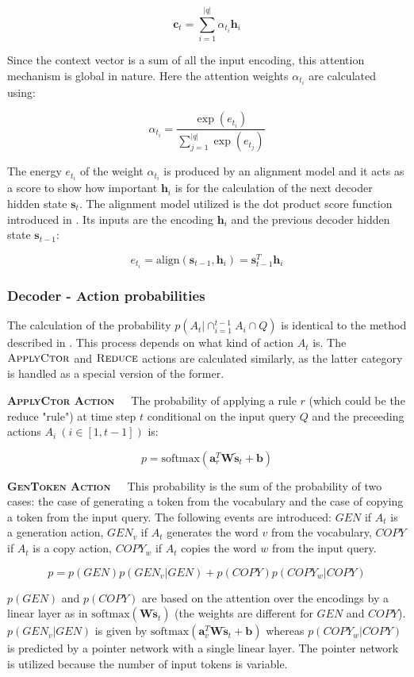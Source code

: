 \[\textbf{c}_{t} = \sum_{i=1}^{|q|}\alpha_{t_{i}}\textbf{h}_{i}\]

Since the context vector is a sum of all the input encoding, this attention
mechanism is global in nature. Here the attention weights \(\alpha_{t_{i}}\)
are calculated using:

\[\alpha_{t_{i}} = \frac{\exp(e_{t_{i}})}{\sum_{j=1}^{|q|}\exp(e_{t_{j}})}\]

The energy \(e_{t_{i}}\) of the weight \(\alpha_{t_{i}}\) is produced by an alignment
model and it acts as a score to show how important \(\textbf{h}_{i}\) is for the
calculation of the next decoder hidden state \(\textbf{s}_{t}\). The alignment
model utilized is the dot product score function introduced in \cite{LuongPhamManning2015}.
Its inputs are the encoding \(\textbf{h}_{i}\) and the previous decoder
hidden state \(\textbf{s}_{t-1}\):

\[e_{t_{i}} = \text{align}(\textbf{s}_{t-1}, \textbf{h}_{i}) = \textbf{s}_{t-1}^{T}\textbf{h}_{i}\]

\subsubsection{Decoder - Action probabilities}

The calculation of the probability \(p(A_{t} | \cap_{i=1}^{t-1} A_{i} \cap Q)\)
is identical to the method described in \cite{YinNeubig2018}. This process
depends on what kind of action \(A_{t}\) is. The \(\textsc{ApplyCtor}\) and
\(\textsc{Reduce}\) actions are calculated similarly, as the latter category
is handled as a special version of the former.

\textbf{\textsc{ApplyCtor Action}}\ \ \ The probability of applying a rule
\(r\) (which could be the reduce "rule") at time step \(t\) conditional
on the input query \(Q\) and the preceeding actions \(A_{i} \ (i \in [1,t-1])\) is:

\[p = \text{softmax}(\textbf{a}_{r}^{T}\textbf{W}\tilde{\textbf{s}}_{t} + \textbf{b})\]


\textbf{\textsc{GenToken Action}}\ \ \ This probability is the sum of the
probability of two cases: the case of generating a token from the vocabulary
and the case of copying a token from the input query. The following events are
introduced: \(GEN\) if \(A_{t}\) is a generation action, \(GEN_{v}\) if \(A_{t}\)
generates the word \(v\) from the vocabulary, \(COPY\) if \(A_{t}\) is a copy
action, \(COPY_{w}\) if \(A_{t}\) copies the word \(w\) from the input query.

\[p = p(GEN)p(GEN_{v}|GEN) + p(COPY)p(COPY_{w}|COPY)\]

\(p(GEN)\) and \(p(COPY)\) are based on the attention over the encodings by
a linear layer as in \(\text{softmax}(\textbf{W}\tilde{\textbf{s}}_{t})\)
(the weights are different for \(GEN\) and \(COPY\)). \(p(GEN_{v}|GEN)\) is
given by \(\text{softmax}(\textbf{a}_{v}^{T}\textbf{W}\tilde{\textbf{s}}_{t}
+ \textbf{b})\) whereas \(p(COPY_{w}|COPY)\) is predicted by a pointer network
\cite{VinyalsFortunatoJaitly2015} with a single linear layer.
The pointer network is utilized because the number of input tokens is variable.